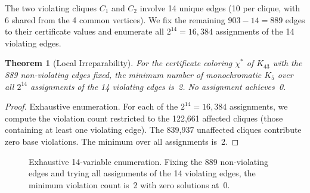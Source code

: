 \documentclass[11pt,a4paper]{article}
\theoremstyle{plain}
\newtheorem{theorem}{Theorem}[section]
\theoremstyle{remark}
\begin{document}
The two violating cliques $C_1$ and $C_2$ involve 14 unique edges
(10 per clique, with 6 shared from the 4 common vertices). We fix
the remaining $903 - 14 = 889$ edges to their certificate values and
enumerate all $2^{14} = 16{,}384$ assignments of the 14 violating
edges.

\begin{theorem}[Local Irreparability]\label{thm:local}
For the certificate coloring $\chi^*$ of $K_{43}$ with the 889
non-violating edges fixed, the minimum number of monochromatic $K_5$
over all $2^{14}$ assignments of the 14 violating edges is~2.
No assignment achieves~0.
\end{theorem}

\begin{proof}
Exhaustive enumeration. For each of the $2^{14} = 16{,}384$
assignments, we compute the violation count restricted to the
122{,}661 affected cliques (those containing at least one violating
edge). The 839{,}937 unaffected cliques contribute zero base
violations. The minimum over all assignments is~2.
\end{proof}

\begin{figure}[H]
\centering
{}
\caption{Exhaustive 14-variable enumeration. Fixing the 889
  non-violating edges and trying all assignments of the 14 violating
  edges, the minimum violation count is~2 with zero solutions at~0.}
\label{fig:exhaustive}
\end{figure}
\end{document}

